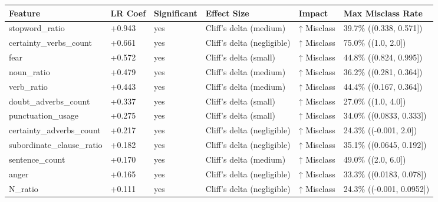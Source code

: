 \begin{tabular}{llllll}
\toprule
Feature & LR Coef & Significant & Effect Size & Impact & Max Misclass Rate \\
\midrule
stopword\_ratio & +0.943 & yes & Cliff's delta (medium) & ↑ Misclass & 39.7\% ((0.338, 0.571]) \\
certainty\_verbs\_count & +0.661 & yes & Cliff's delta (negligible) & ↑ Misclass & 75.0\% ((1.0, 2.0]) \\
fear & +0.572 & yes & Cliff's delta (small) & ↑ Misclass & 44.8\% ((0.824, 0.995]) \\
noun\_ratio & +0.479 & yes & Cliff's delta (medium) & ↑ Misclass & 36.2\% ((0.281, 0.364]) \\
verb\_ratio & +0.443 & yes & Cliff's delta (medium) & ↑ Misclass & 44.4\% ((0.167, 0.364]) \\
doubt\_adverbs\_count & +0.337 & yes & Cliff's delta (small) & ↑ Misclass & 27.0\% ((1.0, 4.0]) \\
punctuation\_usage & +0.275 & yes & Cliff's delta (small) & ↑ Misclass & 34.0\% ((0.0833, 0.333]) \\
certainty\_adverbs\_count & +0.217 & yes & Cliff's delta (negligible) & ↑ Misclass & 24.3\% ((-0.001, 2.0]) \\
subordinate\_clause\_ratio & +0.182 & yes & Cliff's delta (negligible) & ↑ Misclass & 35.1\% ((0.0645, 0.192]) \\
sentence\_count & +0.170 & yes & Cliff's delta (medium) & ↑ Misclass & 49.0\% ((2.0, 6.0]) \\
anger & +0.165 & yes & Cliff's delta (negligible) & ↑ Misclass & 33.3\% ((0.0183, 0.078]) \\
N\_ratio & +0.111 & yes & Cliff's delta (negligible) & ↑ Misclass & 24.3\% ((-0.001, 0.0952]) \\
\bottomrule
\end{tabular}
